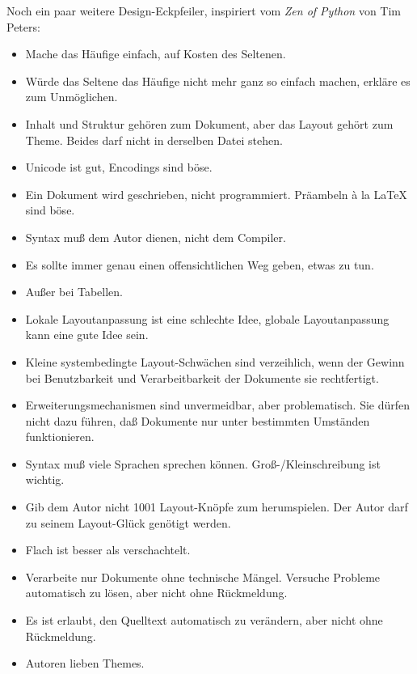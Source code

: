 \documentclass[12pt,openany]{book}
\begin{document}
Noch ein paar weitere Design-Eckpfeiler, inspiriert vom \emph{Zen of Python}
von Tim Peters:

\begin{itemize}
\item Mache das Häufige einfach, auf Kosten des Seltenen.

\item Würde das Seltene das Häufige nicht mehr ganz so einfach machen, erkläre
  es zum Unmöglichen.

\item Inhalt und Struktur gehören zum Dokument, aber das Layout gehört zum
  Theme.  Beides darf nicht in derselben Datei stehen.

\item Unicode ist gut, Encodings sind böse.

\item Ein Dokument wird geschrieben, nicht programmiert.  Präambeln à la LaTeX
  sind böse.

\item Syntax muß dem Autor dienen, nicht dem Compiler.

\item Es sollte immer genau einen offensichtlichen Weg geben, etwas zu tun.

\item Außer bei Tabellen.

\item Lokale Layoutanpassung ist eine schlechte Idee, globale Layoutanpassung
  kann eine gute Idee sein.

\item Kleine systembedingte Layout-Schwächen sind verzeihlich, wenn der Gewinn
  bei Benutzbarkeit und Verarbeitbarkeit der Dokumente sie rechtfertigt.

\item Erweiterungsmechanismen sind unvermeidbar, aber problematisch.  Sie
  dürfen nicht dazu führen, daß Dokumente nur unter bestimmten Umständen
  funktionieren.

\item Syntax muß viele Sprachen sprechen können.  Groß-/Kleinschreibung ist
  wichtig.

\item Gib dem Autor nicht 1001 Layout-Knöpfe zum herumspielen.  Der Autor darf
  zu seinem Layout-Glück genötigt werden.

\item Flach ist besser als verschachtelt.

\item Verarbeite nur Dokumente ohne technische Mängel.  Versuche Probleme
  automatisch zu lösen, aber nicht ohne Rückmeldung.

\item Es ist erlaubt, den Quelltext automatisch zu verändern, aber nicht ohne
  Rückmeldung.

\item Autoren lieben Themes.
\end{itemize}
\end{document}
